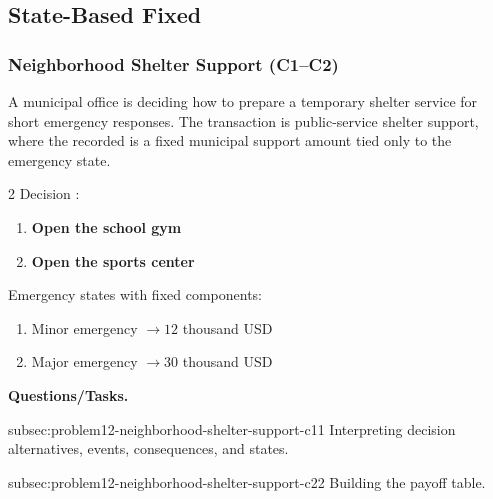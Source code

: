 
	\subsection{State-Based Fixed}
	\label{sec:state-based-fixed-payoff-only}


	\subsubsection{Neighborhood Shelter Support (C1--C2)}
	\label{sec:problem12-neighborhood-shelter-support-c1-c2}
	A municipal office is deciding how to prepare a temporary shelter service for short emergency responses. The transaction is public-service shelter support, where the recorded  is a fixed municipal support amount tied only to the emergency state.

	\begin{multicols}{2}
		Decision :
		\begin{enumerate}[label=\arabic*.]
			\item \textbf{Open the school gym}
			\item \textbf{Open the sports center}
		\end{enumerate}

			\columnbreak

		Emergency states with fixed  components:
		\begin{enumerate}[label=\arabic*.]
			\item Minor emergency $\to 12$ thousand USD
			\item Major emergency $\to 30$ thousand USD
		\end{enumerate}
	\end{multicols}

	\textbf{Questions/Tasks.}
	\begin{enumerate}
		\CriterionTask
		{subsec:problem12-neighborhood-shelter-support-c1}{1}
		{Interpreting decision alternatives, events, consequences, and states.}

		\CriterionTask
		{subsec:problem12-neighborhood-shelter-support-c2}{2}
		{Building the payoff table.}
	\end{enumerate}

